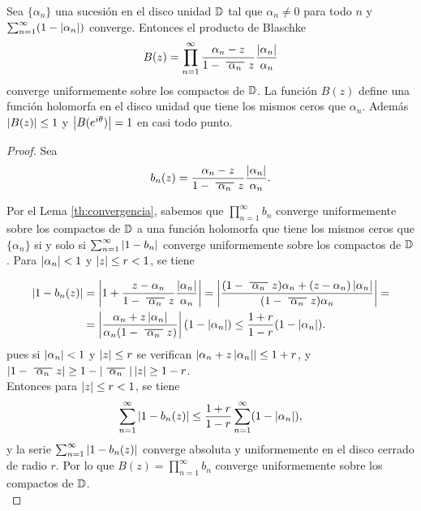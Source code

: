 \begin{theorem}
    Sea $\{\alpha_n\}$ una sucesión en el disco unidad $\mathbb{D}$ tal que $\alpha_n \not = 0$ para todo $n$ y $\sum_{n=1}^{\infty} (1 - \left\lvert\alpha_n\right\rvert)$ converge. Entonces el producto de Blaschke
    \begin{equation*}
        B(z) = \prod_{n=1}^{\infty} \frac{\alpha_n - z}{1 - \xbar{\alpha_n}z} \dfrac{\abs{\alpha_n}}{\alpha_n}
    \end{equation*}
    converge uniformemente sobre los compactos de $\mathbb{D}$. La función $B(z)$ define una función holomorfa en el disco unidad que tiene los mismos ceros que $\alpha_n$. Además $\left\lvert B(z)\right\rvert \leq 1$ y $\left\lvert B(e^{i \theta})\right\rvert = 1$ en casi todo punto.
\end{theorem}

\begin{proof}
    Sea
    \begin{equation*}
        b_n (z) = \frac{\alpha_n - z}{1 - \xbar{\alpha_n}z} \dfrac{\abs{\alpha_n}}{\alpha_n}.
    \end{equation*}

    Por el Lema \ref{th:convergencia}, sabemos que $\prod_{n=1}^{\infty} b_n$ converge uniformemente sobre los compactos de $\mathbb{D}$ a una función holomorfa que tiene los mismos ceros que $\{\alpha_n\}$ si y solo si $\sum_{n=1}^{\infty} \left\lvert1 - b_n\right\rvert$ converge uniformemente sobre los compactos de $\mathbb{D}$. Para $\left\lvert\alpha_n\right\rvert < 1$ y $\left\lvert z\right\rvert \leq r < 1$, se tiene

    \begin{equation*}
        \begin{split}
            \abs{1 - b_n(z)} & = \abs{1 + \dfrac{z - \alpha_n}{1 - \xbar{\alpha_n}z} \dfrac{\abs{\alpha_n}}{\alpha_n}} = \abs{\dfrac{(1 - \xbar{\alpha_n}z) \alpha_n + (z - \alpha_n) \abs{\alpha_n}}{(1 - \xbar{\alpha_n}z) \alpha_n}} = \\
                             & = \abs{ \dfrac{\alpha_n + z \abs{\alpha_n}}{\alpha_n (1 - \xbar{\alpha_n}z)}} (1 - \abs{\alpha_n}) \leq \dfrac{1 + r}{1 - r} (1 - \abs{\alpha_n}).
        \end{split}
    \end{equation*}
    pues si $\left\lvert\alpha_n\right\rvert < 1$ y $\left\lvert z\right\rvert \leq r$ se verifican $\left\lvert\alpha_n + z \left\lvert\alpha_n\right\rvert\right\rvert \leq 1+r$, y $\abs{1- \xbar{\alpha_n}z} \geq 1-\abs{\xbar{\alpha_n}}\abs{z} \geq 1-r$. \\

    Entonces para $\left\lvert z\right\rvert \leq r < 1$, se tiene
    \begin{equation*}
        \sum_{n=1}^{\infty} \left\lvert1 - b_n(z)\right\rvert \leq \dfrac{1 + r}{1 - r} \sum_{n=1}^{\infty} (1 - \left\lvert\alpha_n\right\rvert),
    \end{equation*}
    y la serie $\sum_{n=1}^{\infty} \left\lvert1 - b_n(z)\right\rvert$ converge absoluta y uniformemente en el disco cerrado de radio $r$. Por lo que $B(z) = \prod_{n=1}^{\infty} b_n$ converge uniformemente sobre los compactos de $\mathbb{D}$. \\


\end{proof}
